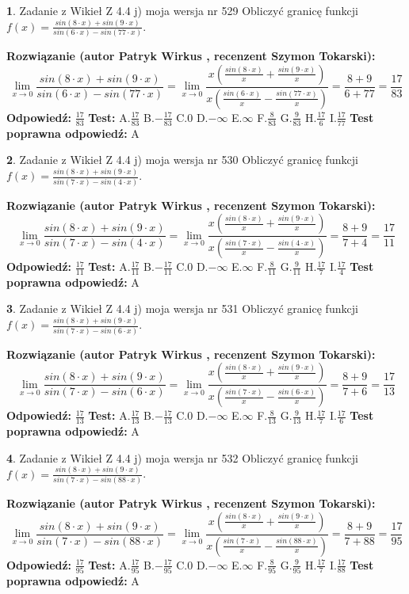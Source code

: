 \documentclass[12pt, a4paper]{article}
\theoremstyle{definition} %
\newtheorem{zad}{}
\newcommand{\zadStart}[1]{\begin{zad}#1\newline}
\newcommand{\zadStop}{\end{zad}}
\newcommand{\rozwStart}[2]{\noindent \textbf{Rozwiązanie (autor #1 , recenzent #2): }\newline}
\newcommand{\rozwStop}{\newline}
\newcommand{\odpStart}{\noindent \textbf{Odpowiedź:}\newline}
\newcommand{\odpStop}{\newline}
\newcommand{\testStart}{\noindent \textbf{Test:}\newline}
\newcommand{\testStop}{\newline}
\newcommand{\kluczStart}{\noindent \textbf{Test poprawna odpowiedź:}\newline}
\newcommand{\kluczStop}{\newline}
\begin{document}
\zadStart{Zadanie z Wikieł Z 4.4 j) moja wersja nr 529}
Obliczyć granicę funkcji $f(x)=\frac{sin(8\cdot x) +sin(9\cdot x)}{sin(6\cdot x) -sin(77\cdot x)}$.
\zadStop
\rozwStart{Patryk Wirkus}{Szymon Tokarski}
$$\lim\limits_{x\to 0}\frac{sin(8\cdot x) +sin(9\cdot x)}{sin(6\cdot x) -sin(77\cdot x)}=\lim\limits_{x\to 0}\frac{x(\frac{sin(8\cdot x)}{x}+\frac{sin(9\cdot x)}{x})}{x(\frac{sin(6\cdot x)}{x}-\frac{sin(77\cdot x)}{x})}=\frac{8+9}{6+77} = \frac{17}{83}$$
\rozwStop
\odpStart
$\frac{17}{83}$
\odpStop
\testStart
A.$\frac{17}{83}$
B.$-\frac{17}{83}$
C.$0$
D.$-\infty$
E.$\infty$
F.$\frac{8}{83}$
G.$\frac{9}{83}$
H.$\frac{17}{6}$
I.$\frac{17}{77}$
\testStop
\kluczStart
A
\kluczStop



\zadStart{Zadanie z Wikieł Z 4.4 j) moja wersja nr 530}
Obliczyć granicę funkcji $f(x)=\frac{sin(8\cdot x) +sin(9\cdot x)}{sin(7\cdot x) -sin(4\cdot x)}$.
\zadStop
\rozwStart{Patryk Wirkus}{Szymon Tokarski}
$$\lim\limits_{x\to 0}\frac{sin(8\cdot x) +sin(9\cdot x)}{sin(7\cdot x) -sin(4\cdot x)}=\lim\limits_{x\to 0}\frac{x(\frac{sin(8\cdot x)}{x}+\frac{sin(9\cdot x)}{x})}{x(\frac{sin(7\cdot x)}{x}-\frac{sin(4\cdot x)}{x})}=\frac{8+9}{7+4} = \frac{17}{11}$$
\rozwStop
\odpStart
$\frac{17}{11}$
\odpStop
\testStart
A.$\frac{17}{11}$
B.$-\frac{17}{11}$
C.$0$
D.$-\infty$
E.$\infty$
F.$\frac{8}{11}$
G.$\frac{9}{11}$
H.$\frac{17}{7}$
I.$\frac{17}{4}$
\testStop
\kluczStart
A
\kluczStop



\zadStart{Zadanie z Wikieł Z 4.4 j) moja wersja nr 531}
Obliczyć granicę funkcji $f(x)=\frac{sin(8\cdot x) +sin(9\cdot x)}{sin(7\cdot x) -sin(6\cdot x)}$.
\zadStop
\rozwStart{Patryk Wirkus}{Szymon Tokarski}
$$\lim\limits_{x\to 0}\frac{sin(8\cdot x) +sin(9\cdot x)}{sin(7\cdot x) -sin(6\cdot x)}=\lim\limits_{x\to 0}\frac{x(\frac{sin(8\cdot x)}{x}+\frac{sin(9\cdot x)}{x})}{x(\frac{sin(7\cdot x)}{x}-\frac{sin(6\cdot x)}{x})}=\frac{8+9}{7+6} = \frac{17}{13}$$
\rozwStop
\odpStart
$\frac{17}{13}$
\odpStop
\testStart
A.$\frac{17}{13}$
B.$-\frac{17}{13}$
C.$0$
D.$-\infty$
E.$\infty$
F.$\frac{8}{13}$
G.$\frac{9}{13}$
H.$\frac{17}{7}$
I.$\frac{17}{6}$
\testStop
\kluczStart
A
\kluczStop



\zadStart{Zadanie z Wikieł Z 4.4 j) moja wersja nr 532}
Obliczyć granicę funkcji $f(x)=\frac{sin(8\cdot x) +sin(9\cdot x)}{sin(7\cdot x) -sin(88\cdot x)}$.
\zadStop
\rozwStart{Patryk Wirkus}{Szymon Tokarski}
$$\lim\limits_{x\to 0}\frac{sin(8\cdot x) +sin(9\cdot x)}{sin(7\cdot x) -sin(88\cdot x)}=\lim\limits_{x\to 0}\frac{x(\frac{sin(8\cdot x)}{x}+\frac{sin(9\cdot x)}{x})}{x(\frac{sin(7\cdot x)}{x}-\frac{sin(88\cdot x)}{x})}=\frac{8+9}{7+88} = \frac{17}{95}$$
\rozwStop
\odpStart
$\frac{17}{95}$
\odpStop
\testStart
A.$\frac{17}{95}$
B.$-\frac{17}{95}$
C.$0$
D.$-\infty$
E.$\infty$
F.$\frac{8}{95}$
G.$\frac{9}{95}$
H.$\frac{17}{7}$
I.$\frac{17}{88}$
\testStop
\kluczStart
A
\kluczStop
\end{document}
